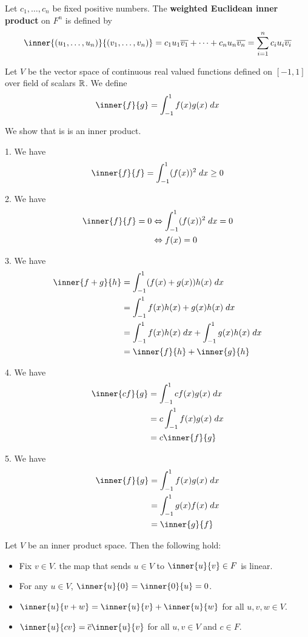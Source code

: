 \documentclass{article}
\begin{document}
\begin{definition}
  Let $c_1, \ldots, c_n$ be fixed positive numbers. The \textbf{weighted Euclidean inner product} on $F^n$ is defined by \[
    \inner{(u_1, \ldots, u_n)}{(v_1, \ldots, v_n)} = c_1u_1\overline{v_1} + \dots + c_nu_n\overline{v_n} =\sum_{i=1}^n c_iu_i\overline{v_i}
  \]
\end{definition}
\begin{example}
  Let $V$ be the vector space of continuous real valued functions defined on $[-1, 1]$ over field of scalars $\mathbb{R}$. We define \[
    \inner{f}{g} = \int_{-1}^1 f(x)g(x) \; dx
  \]

  We show that is is an inner product.

  1. We have \[
    \inner{f}{f} = \int_{-1}^1 (f(x))^2 \; dx \geq 0
  \]

  2. We have
  \begin{align*}
    \inner{f}{f} = 0 & \iff \int_{-1}^1 (f(x))^2 \; dx = 0 \\
                     & \iff f(x) = 0
  \end{align*}

  3. We have
  \begin{align*}
    \inner{f + g}{h} & = \int_{-1}^1 (f(x) + g(x))h(x) \; dx                     \\
                     & = \int_{-1}^1 f(x)h(x) + g(x)h(x) \; dx                   \\
                     & = \int_{-1}^1 f(x)h(x) \; dx + \int_{-1}^1 g(x)h(x) \; dx \\
                     & = \inner{f}{h} + \inner{g}{h}
  \end{align*}

  4. We have
  \begin{align*}
    \inner{cf}{g} & = \int_{-1}^1 cf(x)g(x) \; dx \\
                  & = c\int_{-1}^1 f(x)g(x) \; dx \\
                  & = c\inner{f}{g}
  \end{align*}

  5. We have
  \begin{align*}
    \inner{f}{g} & = \int_{-1}^1 f(x)g(x) \; dx \\
                 & = \int_{-1}^1 g(x)f(x) \; dx \\
                 & = \inner{g}{f}               \\
  \end{align*}
\end{example}
\begin{theorem}
  Let $V$ be an inner product space. Then the following hold:
  \begin{itemize}
    \item Fix $v \in V$. the map that sends $u \in V$ to $\inner{u}{v} \in F$ is linear.
    \item For any $u \in V$, $\inner{u}{0} = \inner{0}{u} = 0$.
    \item $\inner{u}{v+w} = \inner{u}{v} + \inner{u}{w}$ for all $u,v,w \in V$.
    \item $\inner{u}{cv} = \overline{c}\inner{u}{v}$ for all $u, v \in V$ and $c \in F$.
  \end{itemize}
\end{theorem}
\end{document}
